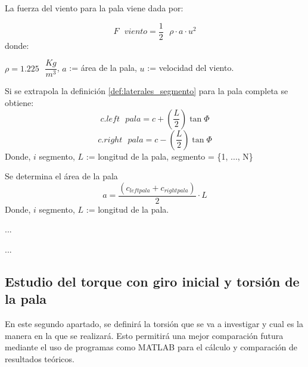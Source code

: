  
 \begin{definicion}
 La fuerza del viento para la pala viene dada por:
 
 $$ F \text{ } viento = \dfrac{1}{2} \text{ } \rho \cdot a \cdot u^2$$
 donde:
 
  \centering  $\rho = 1.225 \text{ } \dfrac{Kg}{m^3}$, $a$ := área de la pala, $u$ := velocidad del viento.
 \label{def:fuerza_viento_inicial}
 \end{definicion}
 
 

 
 \begin{definicion}
Si se extrapola la definición \ref{def:laterales_segmento} para la pala completa se obtiene:
$$ c.left \text{ } pala = c + (\dfrac{L}{2}) \tan \varPhi$$
$$ c.right \text{ } pala = c - (\dfrac{L}{2}) \tan \varPhi$$
\centering 
Donde, $i$ \in segmento, \hspace{7pt} $L$ := longitud de la pala, \hspace{7pt} segmento = \{1, ..., N\}
\label{def:laterales_pala}
\end{definicion}


\begin{definicion}
Se determina el área de la pala
$$ a = \dfrac{(c_{left pala} + c_{right pala})}{2} \cdot L $$
\centering Donde, $i$ \in segmento, \hspace{7} $L$ := longitud de la pala.
\label{def:area_pala}
\end{definicion}
 
 
 
 ...\vspace{400}
 











...
\subsection{Estudio del torque con giro inicial y torsión de la pala}
\label{section:torque_giro_torsion}

En este segundo apartado, se definirá la torsión que se va a investigar y cual es la manera en la que se realizará. Esto permitirá una mejor comparación futura mediante el uso de programas como MATLAB para el cálculo y comparación de resultados teóricos.

